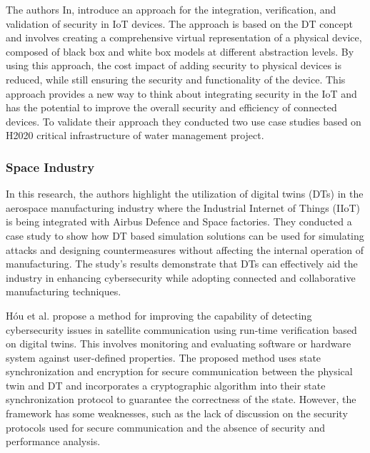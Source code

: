 The authors In\cite{maillet-contozEndtoendSecurityValidation2020}, introduce an approach for the integration, verification, and validation of security in IoT devices. The approach is based on the DT concept and involves creating a comprehensive virtual representation of a physical device, composed of black box and white box models at different abstraction levels. By using this approach, the cost impact of adding security to physical devices is reduced, while still ensuring the security and functionality of the device. This approach provides a new way to think about integrating security in the IoT and has the potential to improve the overall security and efficiency of connected devices. To validate their approach they conducted two use case studies based on H2020 critical infrastructure of water management project.

\subsubsection{Space Industry}

In \cite{adrienbacueDigitalTwinsEnhanced2022} this research, the authors highlight the utilization of digital twins (DTs) in the aerospace manufacturing industry where the Industrial Internet of Things (IIoT) is being integrated with Airbus Defence and Space factories. They conducted a case study to show how DT based simulation solutions can be used for simulating attacks and designing countermeasures without affecting the internal operation of manufacturing. The study's results demonstrate that DTs can effectively aid the industry in enhancing cybersecurity while adopting connected and collaborative manufacturing techniques.

Hóu et al.\cite{houDigitalTwinRuntime2022} propose a method for improving the capability of detecting cybersecurity issues in satellite communication using run-time verification based on digital twins. This involves monitoring and evaluating software or hardware system against user-defined properties. The proposed method uses state synchronization and encryption for secure communication between the physical twin and DT and incorporates a cryptographic algorithm into their state synchronization protocol to guarantee the correctness of the state. However, the framework has some weaknesses, such as the lack of discussion on the security protocols used for secure communication and the absence of security and performance analysis.

